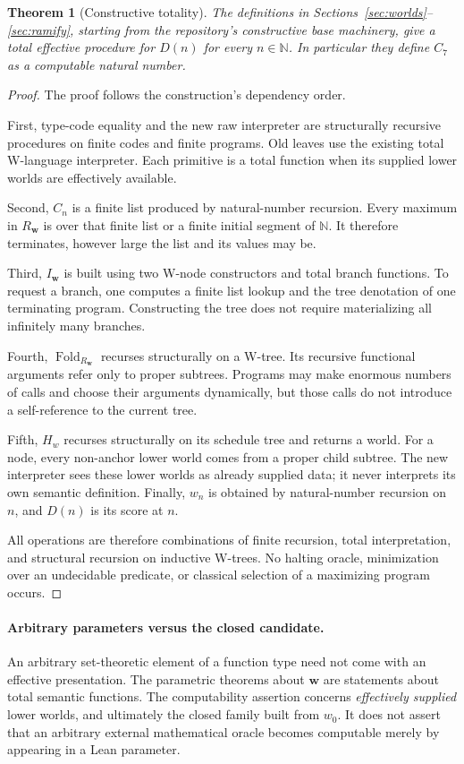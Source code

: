 \documentclass[11pt]{article}
\newtheorem{theorem}{Theorem}[section]
\theoremstyle{definition}
\theoremstyle{remark}
\newcommand{\N}{\mathbb N}
\newcommand{\ctx}{\boldsymbol w}
\begin{document}
\begin{theorem}[Constructive totality]
The definitions in Sections~\ref{sec:worlds}--\ref{sec:ramify}, starting from
the repository's constructive base machinery, give a total effective
procedure for $D(n)$ for every $n\in\N$. In particular they define $C_7$ as
a computable natural number.
\end{theorem}
\begin{proof}
The proof follows the construction's dependency order.

First, type-code equality and the new raw interpreter are structurally
recursive procedures on finite codes and finite programs. Old leaves use the
existing total W-language interpreter. Each primitive is a total function
when its supplied lower worlds are effectively available.

Second, $C_n$ is a finite list produced by natural-number recursion. Every
maximum in $R_{\ctx}$ is over that finite list or a finite initial segment of
$\N$. It therefore terminates, however large the list and its values may be.

Third, $I_{\ctx}$ is built using two W-node constructors and total branch
functions. To request a branch, one computes a finite list lookup and the
tree denotation of one terminating program. Constructing the tree does not
require materializing all infinitely many branches.

Fourth, $\operatorname{Fold}_{R_{\ctx}}$ recurses structurally on a W-tree.
Its recursive functional arguments refer only to proper subtrees. Programs
may make enormous numbers of calls and choose their arguments dynamically,
but those calls do not introduce a self-reference to the current tree.

Fifth, $H_w$ recurses structurally on its schedule tree and returns a world.
For a node, every non-anchor lower world comes from a proper child subtree.
The new interpreter sees these lower worlds as already supplied data; it
never interprets its own semantic definition. Finally, $w_n$ is obtained by
natural-number recursion on $n$, and $D(n)$ is its score at $n$.

All operations are therefore combinations of finite recursion, total
interpretation, and structural recursion on inductive W-trees. No halting
oracle, minimization over an undecidable predicate, or classical selection of
a maximizing program occurs.
\end{proof}

\paragraph{Arbitrary parameters versus the closed candidate.}
An arbitrary set-theoretic element of a function type need not come with an
effective presentation. The parametric theorems about $\ctx$ are statements
about total semantic functions. The computability assertion concerns
\emph{effectively supplied} lower worlds, and ultimately the closed family
built from $w_0$. It does not assert that an arbitrary external mathematical
oracle becomes computable merely by appearing in a Lean parameter.
\end{document}
